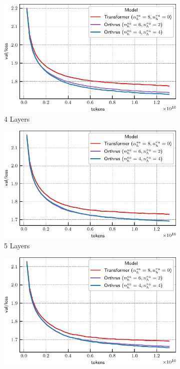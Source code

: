 \begin{figure}[ht]
    \begin{subfigure}{0.33\textwidth}
        \includegraphics[width=\textwidth]{figs/experiments/tiny_stories/d64L4_symattn_asymra.pdf}
        \caption{4 Layers}
    \end{subfigure}
    \begin{subfigure}{0.33\textwidth}
        \includegraphics[width=\textwidth]{figs/experiments/tiny_stories/d64L5_symattn_asymra.pdf}
        \caption{5 Layers}
    \end{subfigure}
    \begin{subfigure}{0.33\textwidth}
        \includegraphics[width=\textwidth]{figs/experiments/tiny_stories/d64L6_symattn_asymra.pdf}

\end{subfigure}
\end{figure}
